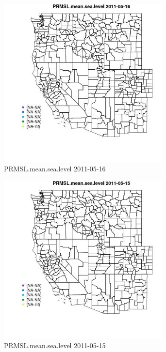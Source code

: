\begin{figure} 
\centering  
\includegraphics[width=0.77\textwidth]{Code_Outputs/ML_input_report_ML_input_PM25_Step5_part_d_de_duplicated_aves_ML_input_MapObsPRMSLmeansealevel2011-05-16.jpg} 
\caption{\label{fig:ML_input_report_ML_input_PM25_Step5_part_d_de_duplicated_aves_ML_inputMapObsPRMSLmeansealevel2011-05-16}PRMSL.mean.sea.level 2011-05-16} 
\end{figure} 
 

\begin{figure} 
\centering  
\includegraphics[width=0.77\textwidth]{Code_Outputs/ML_input_report_ML_input_PM25_Step5_part_d_de_duplicated_aves_ML_input_MapObsPRMSLmeansealevel2011-05-15.jpg} 
\caption{\label{fig:ML_input_report_ML_input_PM25_Step5_part_d_de_duplicated_aves_ML_inputMapObsPRMSLmeansealevel2011-05-15}PRMSL.mean.sea.level 2011-05-15} 
\end{figure} 
 

